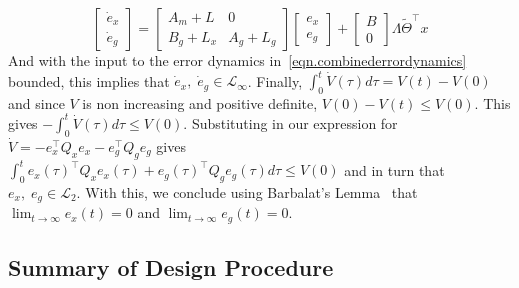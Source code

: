 \documentclass[]{../sty/aiaa-tc}
\theoremstyle{examplestyle}
\begin{document}
\begin{proof-dan}
\begin{equation}
      \begin{bmatrix}
        \dot{e}_{x} \\
        \dot{e}_{g}
      \end{bmatrix}
      =
      \begin{bmatrix}
        A_{m}+L & 0 \\
        B_{g}+L_{x} & A_{g}+L_{g}
      \end{bmatrix}
      \begin{bmatrix}
        e_{x} \\
        e_{g}
      \end{bmatrix}
      +
      \begin{bmatrix}
        B \\
        0
      \end{bmatrix}
      \Lambda\widetilde{\Theta}^{\top}x
    \end{equation}
    And with the input to the error dynamics in\ \eqref{eqn.combinederrordynamics} bounded, this implies that $\dot{e}_{x}, \; \dot{e}_{g}\in\mathcal{L}_{\infty}$.
    Finally, $\int_{0}^{t}\dot{V}(\tau)d\tau=V(t)-V(0)$ and since $V$ is non increasing and positive definite, $V(0)-V(t)\leq V(0)$.
    This gives $-\int_{0}^{t}\dot{V}(\tau)d\tau\leq V(0)$.
    Substituting in our expression for $\dot{V}= - e_{x}^{\top}Q_{x}e_{x} - e_{g}^{\top}Q_{g}e_{g}$ gives $\int_{0}^{t}e_{x}(\tau)^{\top}Q_{x}e_{x}(\tau) + e_{g}(\tau)^{\top}Q_{g}e_{g}(\tau)d\tau\leq V(0)$ and in turn that $e_{x},\;e_{g}\in\mathcal{L}_{2}$.
    With this, we conclude using Barbalat's Lemma\ \cite{narendra.stable.2005} that $\lim_{t\rightarrow\infty}e_{x}(t)=0$ and $\lim_{t\rightarrow\infty}e_{g}(t)=0$.
  \end{proof-dan}

  \subsection{Summary of Design Procedure}
\end{document}
